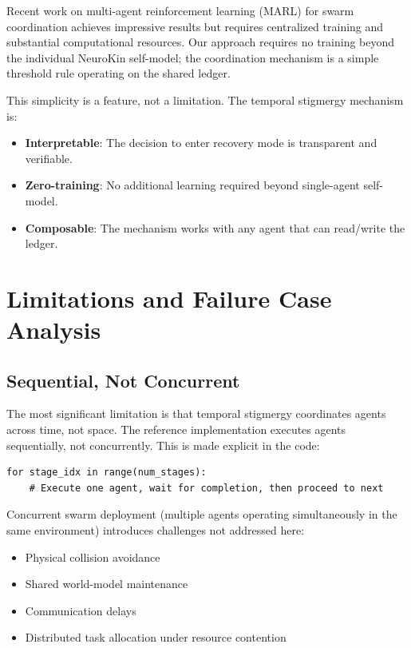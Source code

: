 \documentclass[12pt,a4paper,oneside]{report}
\begin{document}
Recent work on multi-agent reinforcement learning (MARL) for swarm coordination \cite{domberg2026selfadapting, daneshmand2026slowrl} achieves impressive results but requires centralized training and substantial computational resources. Our approach requires no training beyond the individual NeuroKin self-model; the coordination mechanism is a simple threshold rule operating on the shared ledger.

This simplicity is a feature, not a limitation. The temporal stigmergy mechanism is:
\begin{itemize}
    \item \textbf{Interpretable}: The decision to enter recovery mode is transparent and verifiable.
    \item \textbf{Zero-training}: No additional learning required beyond single-agent self-model.
    \item \textbf{Composable}: The mechanism works with any agent that can read/write the ledger.
\end{itemize}

\section{Limitations and Failure Case Analysis}

\subsection{Sequential, Not Concurrent}
\label{subsec:sequential_not_concurrent}

The most significant limitation is that temporal stigmergy coordinates agents across time, not space. The reference implementation executes agents sequentially, not concurrently. This is made explicit in the code:

\begin{verbatim}
for stage_idx in range(num_stages):
    # Execute one agent, wait for completion, then proceed to next
\end{verbatim}

Concurrent swarm deployment (multiple agents operating simultaneously in the same environment) introduces challenges not addressed here:
\begin{itemize}
    \item Physical collision avoidance
    \item Shared world-model maintenance
    \item Communication delays
    \item Distributed task allocation under resource contention
\end{itemize}
\end{document}
